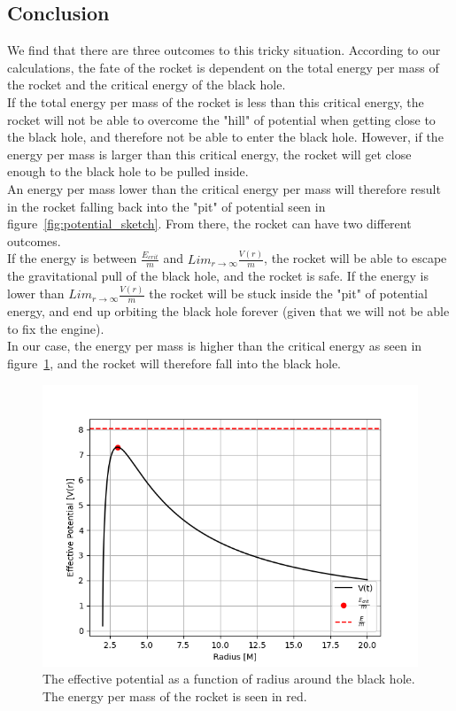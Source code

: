 \documentclass[reprint,english,notitlepage]{revtex4-2}
\begin{document}
    \subsection{Conclusion}\label{subsec:conclusion6}
        We find that there are three outcomes to this tricky situation.
        According to our calculations, the fate of the rocket is dependent on the total energy per mass of the rocket and the critical energy of the black hole.\\

        If the total energy per mass of the rocket is less than this critical energy, the rocket will not be able to overcome the "hill" of potential when getting close to the black hole, and therefore not be able to enter the black hole.
        However, if the energy per mass is larger than this critical energy, the rocket will get close enough to the black hole to be pulled inside.\\
        An energy per mass lower than the critical energy per mass will therefore result in the rocket falling back into the "pit" of potential seen in figure~\ref{fig:potential_sketch}.
        From there, the rocket can have two different outcomes.\\
        If the energy is between $\frac{E_{crit}}{m}$ and $Lim_{r \rightarrow \infty} \frac{V(r)}{m}$, the rocket will be able to escape the gravitational pull of the black hole, and the rocket is safe.
        If the energy is lower than $Lim_{r \rightarrow \infty} \frac{V(r)}{m}$ the rocket will be stuck inside the "pit" of potential energy, and end up orbiting the black hole forever (given that we will not be able to fix the engine).\\

        In our case, the energy per mass is higher than the critical energy as seen in figure~\ref{fig:eff_potential}, and the rocket will therefore fall into the black hole.\\

        \begin{figure}[h]
            \centering
            \includegraphics[scale=0.4]{ex6_effpotential}
            \caption{The effective potential as a function of radius around the black hole. The energy per mass of the rocket is seen in red.}\label{fig:eff_potential}
        \end{figure}
\end{document}
